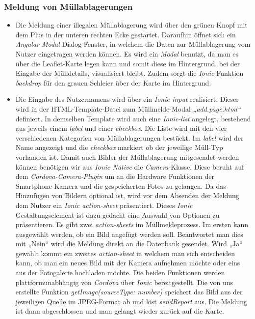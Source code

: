 \documentclass[a4paper, 11pt, DIV=11, listof=numbered, numbers=noenddot]{scrartcl}
\begin{document}
	\subsubsection{Meldung von Müllablagerungen}
	\begin {itemize}
		\item Die Meldung einer illegalen Müllablagerung wird über den grünen Knopf mit dem Plus in der unteren rechten Ecke gestartet. Daraufhin öffnet sich ein \textit{Angular Modal} Dialog-Fenster, in welchem die Daten zur Müllablagerung vom Nutzer eingetragen 					werden können. Es wird ein \textit{Modal} benutzt, da man es über die Leaflet-Karte legen kann und somit diese im Hintergrund, bei der Eingabe der Mülldetails, visualisiert bleibt. Zudem sorgt die \textit{Ionic}-Funktion \textit{backdrop} für den grauen 					Schleier über der Karte im Hintergrund.
		\item Die Eingabe des Nutzernamens wird über ein \textit{Ionic input} realisiert. Dieser wird in der HTML-Template-Datei zum Müllmelde-Modal \textit{„add.page.html“} definiert. In demselben Template wird auch eine \textit{Ionic-list} angelegt, bestehend aus jeweils 				einem \textit{label} und einer \textit{checkbox}. Die Liste wird mit den vier verschiedenen Kategorien von Müllablagerungen bestückt. Im \textit{label} wird der Name angezeigt und die \textit{checkbox} markiert ob der jeweilige Müll-Typ vorhanden ist.
			Damit auch Bilder der Müllablagerung mitgesendet werden können benötigen wir aus\textit{ Ionic Native} die \textit{Camera}-Klasse. Diese beruht auf dem \textit{Cordova-Camera-Plugin} um an die Hardware Funktionen der Smartphone-Kamera und die 				gespeicherten Fotos zu gelangen. Da das Hinzufügen von Bildern optional ist, wird vor dem Absenden der Meldung dem Nutzer ein \textit{Ionic action-sheet} präsentiert. Dieses \textit{Ionic} Gestaltungselement ist dazu gedacht eine Auswahl von Optionen zu 				präsentieren. Es gibt zwei \textit{action-sheets} im Müllmeldeprozess. Im ersten kann ausgewählt werden, ob ein Bild angefügt werden soll. Beantwortet man dies mit „Nein“ wird die Meldung direkt an die Datenbank gesendet. Wird „Ja“ gewählt kommt ein 				zweites \textit{action-sheet} in welchem man sich entscheiden kann, ob man ein neues Bild mit der Kamera aufnehmen möchte oder eins aus der Fotogalerie hochladen möchte. Die beiden Funktionen werden plattformunabhängig von \textit{Cordova} über 				\textit{Ionic} bereitgestellt. Die von uns erstellte Funktion \textit{getImage(sourceType: number)} speichert das Bild aus der jeweiligen Quelle im JPEG-Format ab und löst \textit{sendReport} aus. Die Meldung ist dann abgeschlossen und man gelangt wieder 				zurück auf die Karte.

	\end{itemize}
\end{document}
